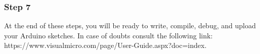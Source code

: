 \begin{refsection}
	\subsubsection{Step 7}
	At the end of these steps, you will be ready to write, compile, debug, and upload your Arduino sketches. In case of doubts consult the following link: https://www.visualmicro.com/page/User-Guide.aspx?doc=index.
	
	\clearpage
	\printbibliography[heading=subbibliography]
\end{refsection}
\cleardoublepage
